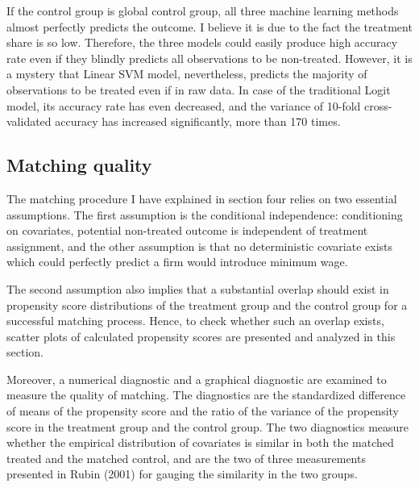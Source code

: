 \documentclass[11pt,a4paper,oneside]{article}
\begin{document}
\par
If the control group is global control group, all three machine learning methods almost perfectly predicts the outcome. I believe it is due to the fact the treatment share is so low. Therefore, the three models could easily produce high accuracy rate even if they blindly predicts all observations to be non-treated. However, it is a mystery that Linear SVM model, nevertheless, predicts the majority of observations to be treated even if in raw data. In case of the traditional Logit model, its accuracy rate has even decreased, and the variance of 10-fold cross-validated accuracy has increased significantly, more than 170 times.
\subsection{Matching quality}
The matching procedure I have explained in section four relies on two essential assumptions. The first assumption is the conditional independence: conditioning on covariates, potential non-treated outcome is independent of treatment assignment, and the other assumption is that no deterministic covariate exists which could perfectly predict a firm would introduce minimum wage. 
\par 
The second assumption also implies that a substantial overlap should exist in propensity score distributions of the treatment group and the control group for a successful matching process. Hence, to check whether such an overlap exists, scatter plots of calculated propensity scores are presented and analyzed in this section.
\par
Moreover, a numerical diagnostic and a graphical diagnostic are examined to measure the quality of matching. The diagnostics are the standardized difference of means of the propensity score and the ratio of the variance of the propensity score in the treatment group and the control group. The two diagnostics measure whether the empirical distribution of covariates is similar in both the matched treated and the matched control, and are the two of three measurements presented in Rubin (2001)\cite{rubin2001using} for gauging the similarity in the two groups.
\end{document}
